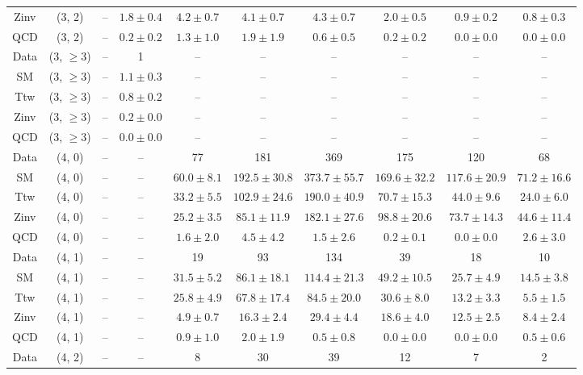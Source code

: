 \begin{table}[h!]
{\begin{tabular}{cccccccccc}
	Zinv & (3, 2) & -- & $1.8\pm 0.4$ & $4.2\pm 0.7$ & $4.1\pm 0.7$ & $4.3\pm 0.7$ & $2.0\pm 0.5$ & $0.9\pm 0.2$ & $0.8\pm 0.3$ \\[0.5ex] 
	QCD & (3, 2) & -- & $0.2\pm 0.2$ & $1.3\pm 1.0$ & $1.9\pm 1.9$ & $0.6\pm 0.5$ & $0.2\pm 0.2$ & $0.0\pm 0.0$ & $0.0\pm 0.0$ \\[0.5ex] 
	Data & (3, $\ge3$) & -- & 1 & -- & -- & -- & -- & -- & -- \\[0.5ex] 
	SM & (3, $\ge3$) & -- & $1.1\pm 0.3$ & -- & -- & -- & -- & -- & -- \\[0.5ex] 
	Ttw & (3, $\ge3$) & -- & $0.8\pm 0.2$ & -- & -- & -- & -- & -- & -- \\[0.5ex] 
	Zinv & (3, $\ge3$) & -- & $0.2\pm 0.0$ & -- & -- & -- & -- & -- & -- \\[0.5ex] 
	QCD & (3, $\ge3$) & -- & $0.0\pm 0.0$ & -- & -- & -- & -- & -- & -- \\[0.5ex] 
	Data & (4, 0) & -- & -- & 77 & 181 & 369 & 175 & 120 & 68 \\[0.5ex] 
	SM & (4, 0) & -- & -- & $60.0\pm 8.1$ & $192.5\pm 30.8$ & $373.7\pm 55.7$ & $169.6\pm 32.2$ & $117.6\pm 20.9$ & $71.2\pm 16.6$ \\[0.5ex] 
	Ttw & (4, 0) & -- & -- & $33.2\pm 5.5$ & $102.9\pm 24.6$ & $190.0\pm 40.9$ & $70.7\pm 15.3$ & $44.0\pm 9.6$ & $24.0\pm 6.0$ \\[0.5ex] 
	Zinv & (4, 0) & -- & -- & $25.2\pm 3.5$ & $85.1\pm 11.9$ & $182.1\pm 27.6$ & $98.8\pm 20.6$ & $73.7\pm 14.3$ & $44.6\pm 11.4$ \\[0.5ex] 
	QCD & (4, 0) & -- & -- & $1.6\pm 2.0$ & $4.5\pm 4.2$ & $1.5\pm 2.6$ & $0.2\pm 0.1$ & $0.0\pm 0.0$ & $2.6\pm 3.0$ \\[0.5ex] 
	Data & (4, 1) & -- & -- & 19 & 93 & 134 & 39 & 18 & 10 \\[0.5ex] 
	SM & (4, 1) & -- & -- & $31.5\pm 5.2$ & $86.1\pm 18.1$ & $114.4\pm 21.3$ & $49.2\pm 10.5$ & $25.7\pm 4.9$ & $14.5\pm 3.8$ \\[0.5ex] 
	Ttw & (4, 1) & -- & -- & $25.8\pm 4.9$ & $67.8\pm 17.4$ & $84.5\pm 20.0$ & $30.6\pm 8.0$ & $13.2\pm 3.3$ & $5.5\pm 1.5$ \\[0.5ex] 
	Zinv & (4, 1) & -- & -- & $4.9\pm 0.7$ & $16.3\pm 2.4$ & $29.4\pm 4.4$ & $18.6\pm 4.0$ & $12.5\pm 2.5$ & $8.4\pm 2.4$ \\[0.5ex] 
	QCD & (4, 1) & -- & -- & $0.9\pm 1.0$ & $2.0\pm 1.9$ & $0.5\pm 0.8$ & $0.0\pm 0.0$ & $0.0\pm 0.0$ & $0.5\pm 0.6$ \\[0.5ex] 
	Data & (4, 2) & -- & -- & 8 & 30 & 39 & 12 & 7 & 2 \\[0.5ex] 

\end{tabular}}
\end{table}
